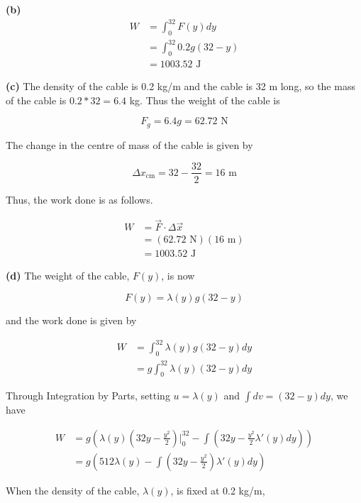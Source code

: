 \documentclass{article}
\begin{document}
    \textbf{(b)}
    \begin{align*}
        W   &= \int_0^{32} F(y)dy \\
            &= \int_0^{32} 0.2g(32-y) \\
            &= 1003.52 \text{ J}
    \end{align*}

    \textbf{(c)}
    The density of the cable is 0.2 kg/m and the cable is 32 m long, so the mass of the cable is $0.2*32=6.4$ kg. Thus the weight of the cable is

    \[
        F_g = 6.4g = 62.72 \text{ N}
    \]

    The change in the centre of mass of the cable is given by

    \[
        \Delta x_{\text{cm}} = 32-\frac{32}{2} = 16\text{ m}
    \]

    Thus, the work done is as follows.

    \begin{align*}
        W &= \vec{F}\cdot \Delta \vec{x} \\
          &= (62.72\text{ N})(16\text{ m})\\
          &= 1003.52\text{ J}
    \end{align*}

    \textbf{(d)}
    The weight of the cable, $F(y)$, is now

    \[
        F(y) = \lambda (y)g(32-y)
    \]

    and the work done is given by

    \begin{align*}
        W   &= \int_0^{32}\lambda(y)g(32-y)dy \\
            &= g\int_0^{32}\lambda(y)(32-y)dy
    \end{align*}

    \pagebreak
    \thispagestyle{3}

    Through Integration by Parts, setting $u=\lambda(y)$ and $\int dv=(32-y)dy$, we have

    \begin{align*}
        W   &= g\left(\lambda(y)\left(32y-\frac{y^2}{2}\right)\Big|_0^{32}-\int\left(32y-\frac{y^2}{2}\lambda '(y)dy\right)\right) \\
            &= g\left(512\lambda(y) - \int \left(32y-\frac{y^2}{2}\right)\lambda '(y)dy \right)
    \end{align*}

    When the density of the cable, $\lambda(y)$, is fixed at 0.2 kg/m,
\end{document}
